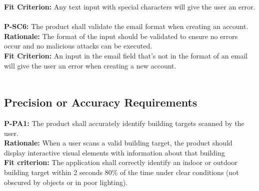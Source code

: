\documentclass[12pt]{article}
\begin{document}
  \textbf{Fit Criterion:} Any text input with special characters will give the user an error.\\\\
  \textbf{P-SC6:} The product shall validate the email format when creating an account.\\
  \textbf{Rationale:} The format of the input should be validated to ensure no errors occur and no malicious attacks can be executed.\\
  \textbf{Fit Criterion:} An input in the email field that's not in the format of an email will give the user an error when creating a new account.\\\\

\subsection{Precision or Accuracy Requirements}
  \textbf{P-PA1:} The product shall accurately identify building targets scanned by the user.\\
  \textbf{Rationale:} When a user scans a valid building target, the product should display interactive visual elements with information about that building\\
  \textbf{Fit criterion:} The application shall correctly identify an indoor or outdoor building target within 2 seconds 80\% of the time under clear conditions (not obscured by objects or in poor lighting).\\\\
\end{document}
